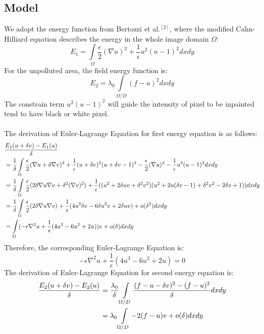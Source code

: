 \documentclass[a4paper]{article}
\begin{document}
\begin{spacing}{1.4}
\subsection{Model}
We adopt the energy function from Bertozzi et al.$^{[2]}$, where the modified Cahn-Hilliard equation describes the energy in the whole image domain $\Omega$:\\
$$ E_{1} = \int \limits_\Omega \frac{\epsilon}{2}(\nabla u)^2+\frac{1}{\epsilon}u^2(u-1)^2 dxdy$$ 
For the unpolluted area, the field energy function is:\\
$$ E_{2} = \lambda_{0} \int \limits_{\Omega\slash D} (f-u)^2 dxdy$$
The constrain term $u^2(u-1)^2$ will guide the intensity of pixel to be inpainted tend to have black or white pixel.\\
~\\
The derivation of Euler-Lagrange Equation for first energy equation is as follows:\\
\begin{align}
&\frac{E_1(u+\delta v)- E_1(u)}{\delta} \notag\\
&= \frac{1}{\delta} \int \limits_\Omega \frac{\epsilon}{2}(\nabla u +\delta \nabla v)^2 + \frac{1}{\epsilon}(u+\delta v)^2(u+\delta v-1)^2 - \frac{\epsilon}{2}(\nabla u)^2 - \frac{1}{\epsilon}u^2(u-1)^2 dxdy \notag\\
 &= \frac{1}{\delta} \int \limits_\Omega \frac{\epsilon}{2}(2\delta\nabla u\nabla v+\delta^2 (\nabla v)^2)+\frac{1}{\epsilon}((u^2+2\delta u v+\delta^2 v^2)(u^2+2u(\delta v -1) +\delta^2 v^2-2\delta v +1))dxdy\notag\\
 &=\frac{1}{\delta} \int \limits_\Omega \frac{\epsilon}{2}(2\delta\nabla u\nabla v)+\frac{1}{\epsilon}(4u^3\delta v - 6 \delta u^2 v + 2\delta u v) + o(\delta^2) dxdy\notag\\
 &=\int \limits_\Omega (-\epsilon \nabla^2 u+\frac{1}{\epsilon}(4u^3-6u^2+2u))v +o(\delta)dxdy\notag
\end{align}
Therefore, the corresponding Euler-Lagrange Equation is:\\
$$-\epsilon \nabla^2 u+\frac{1}{\epsilon}(4u^3-6u^2+2u) = 0$$
The derivation of Euler-Lagrange Equation for second energy equation is:\\
\begin{align}
\frac{E_2(u+\delta v)- E_2(u)}{\delta} &= \frac{\lambda_0}{\delta} \int \limits_{\Omega\slash D}\frac{(f-u-\delta v)^2 - (f-u)^2}{\delta}dxdy\notag\\
&=\lambda_0\int \limits_{\Omega\slash D}-2(f-u)v+o(\delta)dxdy\notag
\end{align}

\end{spacing}
\end{document}

